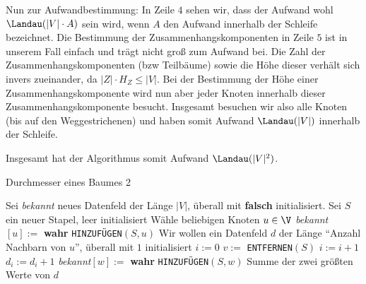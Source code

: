 \begin{solution}
Nun zur Aufwandbestimmung: In Zeile $4$ sehen wir, dass der Aufwand wohl $\Landau(|V| \cdot A)$ sein wird, wenn $A$ den Aufwand innerhalb der Schleife bezeichnet. Die Bestimmung der Zusammenhangskomponenten in Zeile $5$ ist in unserem Fall einfach und trägt nicht groß zum Aufwand bei. Die Zahl der Zusammenhangskomponenten (bzw Teilbäume) sowie die Höhe dieser verhält sich invers zueinander, da $|Z| \cdot H_Z \leq |V|$. Bei der Bestimmung der Höhe einer Zusammenhangskomponente wird nun aber jeder Knoten innerhalb dieser Zusammenhangskomponente besucht. Insgesamt besuchen wir also alle Knoten (bis auf den Weggestrichenen) und haben somit Aufwand $\Landau(|V|)$ innerhalb der Schleife.

Insgesamt hat der Algorithmus somit Aufwand $\Landau(|V|^2)$.
\end{solution}


\begin{solution}
	\phantom{}
		\begin{algorithm}
		\caption{Durchmesser eines Baumes 2} 
		\begin{algorithmic}[1]
			\State Sei \textit{bekannt} neues Datenfeld der Länge $|V|$, überall mit \textbf{falsch} initialisiert.
			\State Sei $S$ ein neuer Stapel, leer initialisiert
			\State Wähle beliebigen Knoten $u \in \V$ 
			\State \textit{bekannt}$[u] :=$ \textbf{wahr}
			\State \verb|HINZUFÜGEN|$(S,u)$
			\State Wir wollen ein Datenfeld $d$ der Länge ``Anzahl Nachbarn von $u$'', überall mit $1$ initialisiert 
			\State $i := 0$
			\State $v :=$ \verb|ENTFERNEN|$(S)$
			\State $i := i + 1$
			\Else
			\State $d_i := d_i + 1$
			\EndIf
			\State  \textit{bekannt}$[w] :=$ \textbf{wahr}
			\State \verb|HINZUFÜGEN|$(S,w)$
			\EndIf
			\EndFor
			\EndWhile
			\Return Summe der zwei größten Werte von $d$
			\EndProcedure
		\end{algorithmic}
	\end{algorithm}
\end{solution}
